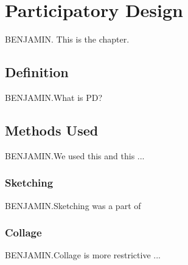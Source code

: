 \section{Participatory Design}
BENJAMIN. This is the chapter.
\subsection{Definition}
BENJAMIN.What is PD?

\subsection{Methods Used}
BENJAMIN.We used this and this ...

\subsubsection{Sketching}
BENJAMIN.Sketching was a part of

\subsubsection{Collage}
BENJAMIN.Collage is more restrictive ...